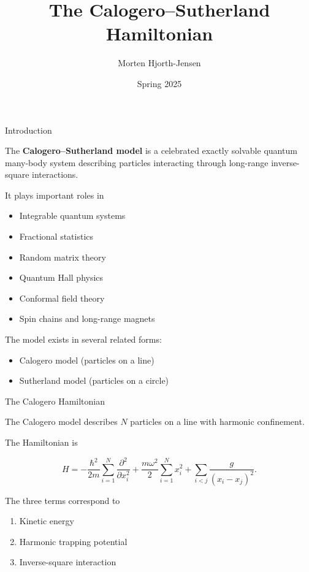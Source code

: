\documentclass{beamer}
\title{The Calogero--Sutherland Hamiltonian}
\author{Morten Hjorth-Jensen}
\date{Spring 2025}
\begin{document}
\begin{frame}
\titlepage
\end{frame}

\begin{frame}{Introduction}

The \textbf{Calogero--Sutherland model} is a celebrated exactly solvable
quantum many-body system describing particles interacting through
long-range inverse-square interactions.

\vspace{0.3cm}

It plays important roles in

\begin{itemize}
    \item Integrable quantum systems
    \item Fractional statistics
    \item Random matrix theory
    \item Quantum Hall physics
    \item Conformal field theory
    \item Spin chains and long-range magnets
\end{itemize}

\vspace{0.3cm}

The model exists in several related forms:
\begin{itemize}
    \item Calogero model (particles on a line)
    \item Sutherland model (particles on a circle)
\end{itemize}

\end{frame}

\begin{frame}{The Calogero Hamiltonian}

The Calogero model describes $N$ particles on a line with harmonic confinement.

\vspace{0.3cm}

The Hamiltonian is

\[
H =
-\frac{\hbar^2}{2m}
\sum_{i=1}^{N}
\frac{\partial^2}{\partial x_i^2}
+
\frac{m\omega^2}{2}
\sum_{i=1}^{N}x_i^2
+
\sum_{i<j}
\frac{g}{(x_i-x_j)^2}.
\]

\vspace{0.3cm}

The three terms correspond to

\begin{enumerate}
    \item Kinetic energy
    \item Harmonic trapping potential
    \item Inverse-square interaction
\end{enumerate}

\end{frame}
\end{document}
